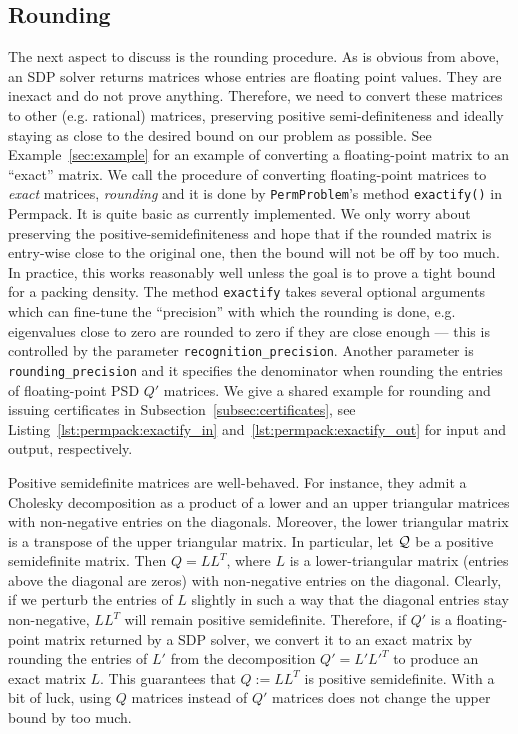 \subsection{Rounding}
The next aspect to discuss is the rounding procedure. As is obvious from above, an SDP solver returns matrices whose entries are floating point values. They are inexact and do not prove anything. Therefore, we need to convert these matrices to other (e.g. rational) matrices, preserving positive semi-definiteness and ideally staying as close to the desired bound on our problem as possible. See Example~\ref{sec:example} for an example of converting a floating-point matrix to an ``exact'' matrix. We call the procedure of converting floating-point matrices to \emph{exact} matrices, \emph{rounding} and it is done by \texttt{PermProblem}'s method \texttt{exactify()} in Permpack. It is quite basic as currently implemented. We only worry about preserving the positive-semidefiniteness and hope that if the rounded matrix is entry-wise close to the original one, then the bound will not be off by too much. In practice, this works reasonably well unless the goal is to prove a tight bound for a packing density. The method \texttt{exactify} takes several optional arguments which can fine-tune the ``precision'' with which the rounding is done, e.g. eigenvalues close to zero are rounded to zero if they are close enough --- this is controlled by the parameter \texttt{recognition\_precision}. Another parameter is \texttt{rounding\_precision} and it specifies the denominator when rounding the entries of floating-point PSD $Q'$ matrices. We give a shared example for rounding and issuing certificates in Subsection~\ref{subsec:certificates}, see Listing~\ref{lst:permpack:exactify_in} and~\ref{lst:permpack:exactify_out} for input and output, respectively.

Positive semidefinite matrices are well-behaved. For instance, they admit a Cholesky decomposition as a product of a lower and an upper triangular matrices with non-negative entries on the diagonals. Moreover, the lower triangular matrix is a transpose of the upper triangular matrix. In particular, let $\mathcal{Q}$ be a positive semidefinite matrix. Then $Q = LL^T$, where $L$ is a lower-triangular matrix (entries above the diagonal are zeros) with non-negative entries on the diagonal. Clearly, if we perturb the entries of $L$ slightly in such a way that the diagonal entries stay non-negative, $LL^T$ will remain positive semidefinite. Therefore, if $Q'$ is a floating-point matrix returned by a SDP solver, we convert it to an exact matrix by rounding the entries of $L'$ from the decomposition $Q' = L'L'^T$ to produce an exact matrix $L$. This guarantees that $Q := LL^T$ is positive semidefinite. With a bit of luck, using $Q$ matrices instead of $Q'$ matrices does not change the upper bound by too much. 

